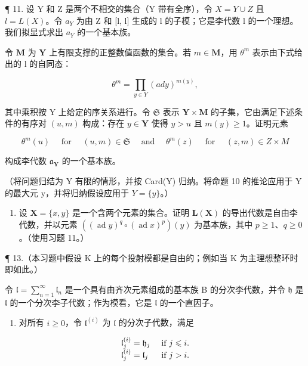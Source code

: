 ¶ 11. 设 Y 和 Z 是两个不相交的集合（Y 带有全序），令 \(X = Y \cup Z\) 且 \(l = L(X)\)。令 \(a_{Y}\) 为由 Z 和 {[}l, l{]} 生成的 l 的子模；它是李代数 l 的一个理想。我们拟显式求出 \(a_{Y}\) 的一个基本族。

令 \(\mathbf{M}\) 为 \(\mathbf{Y}\) 上有限支撑的正整数值函数的集合。若 \(m\in \mathbf{M}\)，用 \(\theta^m\) 表示由下式给出的 l 的自同态：

\[
\theta^ {m} = \prod_ {y \in Y} (a d y) ^ {m (y)},
\]

其中乘积按 Y 上给定的序关系进行。令 \(\mathfrak{S}\) 表示 \(\mathbf{Y} \times \mathbf{M}\) 的子集，它由满足下述条件的有序对 \((u, m)\) 构成：存在 \(y \in \mathbf{Y}\) 使得 \(y > u\) 且 \(m(y) \geqslant 1\)。证明元素

\[
\theta^ {m} (u) \quad \text { for } \quad (u, m) \in \mathfrak {S} \quad \text { and } \quad \theta^ {m} (z) \quad \text { for } \quad (z, m) \in Z \times M
\]

构成李代数 \(\mathfrak{a}_{\mathbf{Y}}\) 的一个基本族。

（将问题归结为 Y 有限的情形，并按 Card(Y) 归纳。将命题 10 的推论应用于 Y 的最大元 y，并将归纳假设应用于 \(Y = \{y\}\)。）

\begin{enumerate}
\def\labelenumi{\arabic{enumi}.}
\setcounter{enumi}{11}
\tightlist
\item
  设 \(\mathbf{X} = \{x, y\}\) 是一个含两个元素的集合。证明 \(\mathbf{L}(\mathbf{X})\) 的导出代数是自由李代数，并以元素 \(((\operatorname{ad}y)^q \circ (\operatorname{ad}x)^p)(y)\) 为基本族，其中 \(p \geqslant 1\)、\(q \geqslant 0\)。（使用习题 11。）
\end{enumerate}

¶ 13.（本习题中假设 K 上的每个投射模都是自由的；例如当 K 为主理想整环时即如此。）

令 \(\mathfrak{l} = \sum_{n=1}^{\infty} \mathfrak{l}_n\) 是一个具有由齐次元素组成的基本族 B 的分次李代数，并令 \(\mathfrak{h}\) 是 \(\mathfrak{l}\) 的一个分次李子代数；作为模看，它是 \(\mathfrak{l}\) 的一个直因子。

\begin{enumerate}
\def\labelenumi{(\alph{enumi})}
\tightlist
\item
  对所有 \(i \geqslant 0\)，令 \(\mathfrak{l}^{(i)}\) 为 \(\mathfrak{l}\) 的分次子代数，满足
\end{enumerate}

\[
\begin{array}{l l} \mathfrak {l} _ {j} ^ {(i)} = \mathfrak {h} _ {j} & \text { if } j \leqslant i. \\ \mathfrak {l} _ {j} ^ {(i)} = \mathfrak {l} _ {j} & \text { if } j > i. \end{array}
\]


